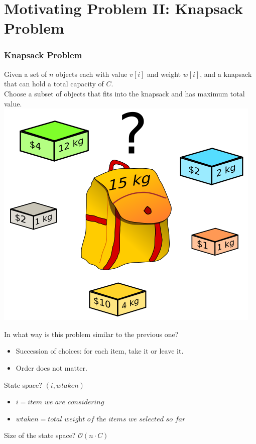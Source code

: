 \documentclass[12pt]{beamer}
\newcommand{\bigoh}[1]{\mathcal{O}\left(#1\right)}
\newcommand{\blank}{\vspace{.5cm}}
\begin{document}
\section{Motivating Problem II: Knapsack Problem}

\begin{frame}
    \frametitle{Knapsack Problem}
    Given a set of $n$ objects each with value $v[i]$ and weight $w[i]$, and a knapsack that can hold a total capacity of $C$. \\\blank
    Choose a subset of objects that fits into the knapsack and has maximum total value. \\\blank
    \flushright
    \includegraphics[scale=.2]{img/knapsack.png}
\end{frame}

\begin{frame}
    In what way is this problem similar to the previous one? \pause \\\blank
    \begin{itemize}
        \item Succession of choices: for each item, take it or leave it. \blank
        \item Order does not matter. \blank
    \end{itemize}
    State space? \pause $(i, wtaken)$ \\\blank
    \begin{itemize}
        \item $i = \textit{item we are considering}$
        \item $wtaken = \textit{total weight of the items we selected so far}$
    \end{itemize}
    \blank
    Size of the state space? \pause $\bigoh{n \cdot C}$
\end{frame}
\end{document}
